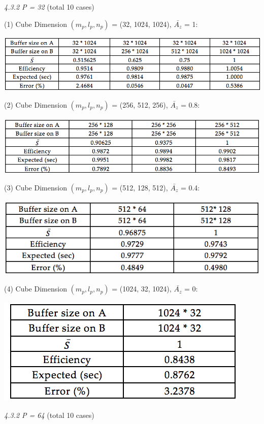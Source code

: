 \documentclass{amsart}
\theoremstyle{definition}
\theoremstyle{remark}
\numberwithin{equation}{section}
\begin{document}
\emph{4.3.2 P = 32} (total 10 cases)

(1) Cube Dimension $(m_p , l_p, n_p)$ = (32, 1024, 1024), $\bar{A_z}$ = 1:

\includegraphics[scale=0.8]{figures/table_p32_1.png}

(2) Cube Dimension $(m_p , l_p, n_p)$ = (256, 512, 256), $\bar{A_z}$ = 0.8:

\includegraphics[scale=0.8]{figures/table_p32_2.png}

(3) Cube Dimension $(m_p , l_p, n_p)$ = (512, 128, 512), $\bar{A_z}$ = 0.4:

\includegraphics[scale=0.8]{figures/table_p32_3.png}

(4) Cube Dimension $(m_p , l_p, n_p)$ = (1024, 32, 1024), $\bar{A_z}$ = 0:

\includegraphics[scale=0.8]{figures/table_p32_4.png}



\emph{4.3.2 P = 64} (total 10 cases)
\end{document}
